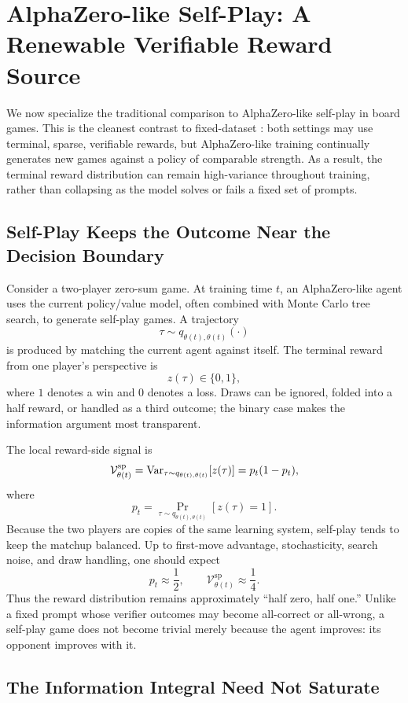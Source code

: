 \section{AlphaZero-like Self-Play: A Renewable Verifiable Reward Source}

We now specialize the traditional \rl{} comparison to AlphaZero-like self-play in board games. This is the cleanest contrast to fixed-dataset \llm{} \rlvr{}: both settings may use terminal, sparse, verifiable rewards, but AlphaZero-like training continually generates new games against a policy of comparable strength. As a result, the terminal reward distribution can remain high-variance throughout training, rather than collapsing as the model solves or fails a fixed set of prompts.

\subsection{Self-Play Keeps the Outcome Near the Decision Boundary}

Consider a two-player zero-sum game. At training time $t$, an AlphaZero-like agent uses the current policy/value model, often combined with Monte Carlo tree search, to generate self-play games. A trajectory
\[
  \tau \sim q_{\theta(t),\theta(t)}(\cdot)
\]
is produced by matching the current agent against itself. The terminal reward from one player's perspective is
\[
  z(\tau)\in\{0,1\},
\]
where $1$ denotes a win and $0$ denotes a loss. Draws can be ignored, folded into a half reward, or handled as a third outcome; the binary case makes the information argument most transparent.

The local reward-side signal is
\[
  \mathcal{V}_{\theta(t)}^{\mathrm{sp}}
  =
  \mathrm{Var}_{\tau\sim q_{\theta(t),\theta(t)}}[z(\tau)]
  =
  p_t(1-p_t),
\]
where
\[
  p_t=\Pr_{\tau\sim q_{\theta(t),\theta(t)}}[z(\tau)=1].
\]
Because the two players are copies of the same learning system, self-play tends to keep the matchup balanced. Up to first-move advantage, stochasticity, search noise, and draw handling, one should expect
\[
  p_t \approx \frac{1}{2},
  \qquad
  \mathcal{V}_{\theta(t)}^{\mathrm{sp}}
  \approx
  \frac{1}{4}.
\]
Thus the reward distribution remains approximately ``half zero, half one.'' Unlike a fixed prompt whose verifier outcomes may become all-correct or all-wrong, a self-play game does not become trivial merely because the agent improves: its opponent improves with it.

\subsection{The Information Integral Need Not Saturate}

